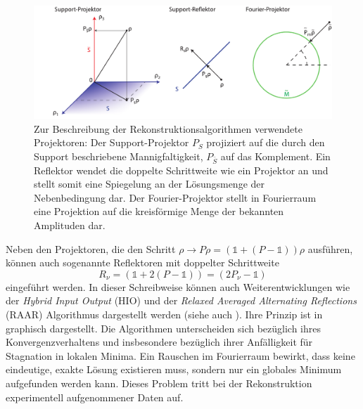 \begin{figure}
	\centering
	\includegraphics[width=1\textwidth]{images/projektor.pdf}
	\caption[Projektoren zur Beschreibung der Rekonstruktionsalgorithmen]{Zur Beschreibung der Rekonstruktionsalgorithmen verwendete Projektoren: Der Support-Projektor $P_S$ projiziert auf die durch den Support beschriebene Mannigfaltigkeit, $P_{\bar{S}}$ auf das Komplement. Ein Reflektor wendet die doppelte Schrittweite wie ein Projektor an und stellt somit eine Spiegelung an der Lösungsmenge der Nebenbedingung dar. Der Fourier-Projektor stellt in Fourierraum eine Projektion auf die kreisförmige Menge der bekannten Amplituden dar.}
	\label{fig:projektoren}
\end{figure}
Neben den Projektoren, die den Schritt $\rho \rightarrow P\rho = (\mathbb{1}+(P-\mathbb{1}))\rho$ ausführen, können auch sogenannte Reflektoren mit doppelter Schrittweite
\begin{equation}
	R_\nu= (\mathbb{1}+2(P-\mathbb{1}))=(2P_\nu-\mathbb{1})
\end{equation}
eingeführt werden.
In dieser Schreibweise können auch Weiterentwicklungen wie der \textit{Hybrid Input Output} (HIO) und  der\textit{ Relaxed Averaged Alternating Reflections} (RAAR) Algorithmus dargestellt werden (siehe auch ). Ihre Prinzip ist in  graphisch dargestellt. Die Algorithmen unterscheiden sich bezüglich ihres Konvergenzverhaltens und insbesondere bezüglich ihrer Anfälligkeit für Stagnation in lokalen Minima. 
Ein Rauschen im Fourierraum bewirkt, dass keine eindeutige, exakte Lösung existieren muss, sondern nur ein globales Minimum aufgefunden werden kann. Dieses Problem tritt bei der Rekonstruktion experimentell aufgenommener Daten auf.
